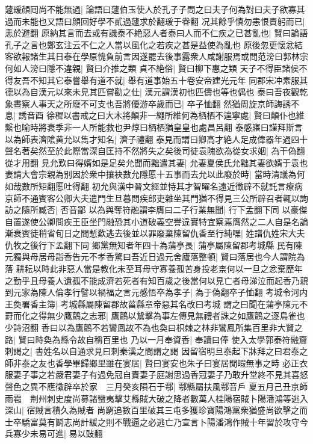 蘧瑗顔囘尚不能無過|{
	論語曰蘧伯玉使人於孔子子問之曰夫子何為對曰夫子欲寡其過而未能也又語曰顔回好學不貳過蘧求於翻瑗于眷翻}
况其餘乎慎勿恚恨責躬而已|{
	恚於避翻}
原納其言而去或有譏泰不絶惡人者泰曰人而不仁疾之已甚亂也|{
	賢曰論語孔子之言也鄭玄注云不仁之人當以風化之若疾之甚是益使為亂也}
原後忽更懷忿結客欲報諸生其日泰在學原愧負前言因遂罷去後事露衆人咸謝服焉或問范滂曰郭林宗何如人滂曰隱不違親|{
	賢曰介推之類}
貞不絶俗|{
	賢曰柳下惠之類}
天子不得臣諸侯不得友吾不知其它泰嘗舉有道不就|{
	舉有道事始五十卷安帝建光元年}
同郡宋冲素服其德以為自漢元以來未見其匹嘗勸之仕|{
	漢元謂漢初也匹儔也等也偶也}
泰曰吾夜觀乾象晝察人事天之所廢不可支也吾將優游卒歲而已|{
	卒子恤翻}
然猶周旋京師誨誘不息|{
	誘音酉}
徐穉以書戒之曰大木將顛非一繩所維何為栖栖不遑寧處|{
	賢曰顛仆也維繫也喻時將衰季非一人所能救也尹焞曰栖栖猶皇皇也處昌呂翻}
泰感寤曰謹拜斯言以為師表濟隂黄允以雋才知名|{
	濟子禮翻}
泰見而謂曰卿高才絶人足成偉器年過四十聲名著矣然至於此際當深自匡持不然將失之矣後司徒袁隗欲為從女求姻|{
	為干偽翻從才用翻}
見允歎曰得婿如是足矣允聞而黜遣其妻|{
	允妻夏侯氏允黜其妻欲婿于袁也}
妻請大會宗親為别因於衆中攘袂數允隱慝十五事而去允以此廢於時|{
	當時清議為何如哉數所矩翻慝吐得翻}
初允與漢中晉文經並恃其才智曜名遠近徵辟不就託言療病京師不通賓客公卿大夫遣門生旦暮問疾郎吏雜坐其門猶不得見三公所辟召者輒以詢訪之隨所臧否|{
	否音鄙}
以為與奪符融謂李膺曰二子行業無聞|{
	行下孟翻下同}
以豪傑自置遂使公卿問疾王臣坐門融恐其小道破義空譽違實特宜察焉膺然之二人自是名論漸衰賓徒稍省旬日之間慙歎逃去後並以罪廢棄陳留仇香至行純嘿|{
	姓譜仇姓宋大夫仇牧之後行下孟翻下同}
鄉黨無知者年四十為蒲亭長|{
	蒲亭屬陳留郡考城縣}
民有陳元獨與母居母詣香告元不孝香驚曰吾近日過元舍廬落整頓|{
	賢曰落居也今人謂院為落}
耕耘以時此非惡人當是教化未至耳母守寡養孤苦身投老柰何以一旦之忿棄歷年之勤乎且母養人遺孤不能成濟若死者有知百歲之後當何以見亡者母涕泣而起香乃親到元家為陳人倫孝行譬以禍福之言元感悟卒為孝子|{
	為于偽翻卒子恤翻}
考城令河内王奐署香主簿|{
	考城縣屬陳留郡故菑縣章帝惡其名改曰考城}
謂之曰聞在蒲亭陳元不罸而化之得無少鷹鸇之志邪|{
	鷹鸇以鷙擊為事左傳見無禮者誅之如鷹鸇之逐鳥雀也少詩沼翻}
香曰以為鷹鸇不若鸞鳳故不為也奐曰枳棘之林非鸞鳳所集百里非大賢之路|{
	賢曰時奐為縣令故自稱百里也}
乃以一月奉資香|{
	奉讀曰俸}
使入太學郭泰符融齎刺謁之|{
	書姓名以自通求見曰刺秦漢之間謂之謁}
因留宿明旦泰起下牀拜之曰君泰之師非泰之友也香學畢歸鄉里雖在宴居|{
	賢曰宴安也朱子曰宴居閒暇無事之時}
必正衣服妻子事之若嚴君妻子有過免冠自責妻子庭謝思過香冠妻子乃敢升堂終不見其喜怒聲色之異不應徵辟卒於家　三月癸亥隕石于鄠|{
	鄠縣屬扶風鄠音戶}
夏五月己丑京師雨雹　荆州刺史度尚募諸蠻夷擊艾縣賊大破之降者數萬人桂陽宿賊卜陽潘鴻等逃入深山|{
	宿賊言積久為賊者}
尚窮追數百里破其三屯多獲珍寶陽鴻黨衆猶盛尚欲擊之而士卒驕富莫有鬭志尚計緩之則不戰逼之必逃亡乃宣言卜陽潘鴻作賊十年習於攻守今兵寡少未易可進|{
	易以䜴翻}
